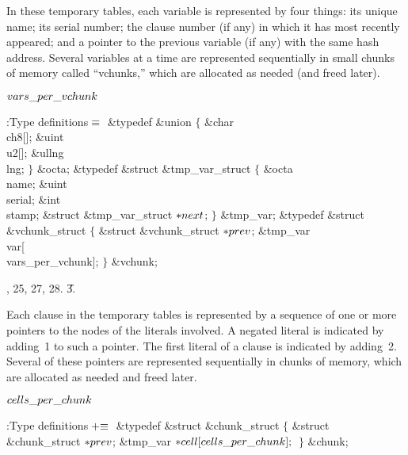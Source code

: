 In these temporary tables, each variable is represented by four things:
its unique name; its serial number; the clause number (if any) in which it has
most recently appeared; and a pointer to the previous variable (if any)
with the same hash address. Several variables at a time
are represented sequentially in small chunks of memory called ``vchunks,''
which are allocated as needed (and freed later).

\Y\B\4\D$\\{vars\_per\_vchunk}$ \5
\par
\Y\B\4:Type definitions\X${}\equiv{}$\6
\&{typedef} \&{union} ${}\{{}$\1\6
\&{char} \\{ch8}[];\6
\&{uint} \\{u2}[];\6
\&{ullng} \\{lng};\2\6
${}\}{}$ \&{octa};\6
\&{typedef} \&{struct} \&{tmp\_var\_struct} ${}\{{}$\1\6
\&{octa} \\{name};\6
\&{uint} \\{serial};\6
\&{int} \\{stamp};\6
\&{struct} \&{tmp\_var\_struct} ${}{*}\\{next}{}$;\2%
\6
${}\}{}$ \&{tmp\_var};\7
\&{typedef} \&{struct} \&{vchunk\_struct} ${}\{{}$\1\6
\&{struct} \&{vchunk\_struct} ${}{*}\\{prev}{}$;\6
\&{tmp\_var} \\{var}[\\{vars\_per\_vchunk}];\2\6
${}\}{}$ \&{vchunk};\par
{}, 25, 27, 28.
\U3.\fi

Each clause in the temporary tables is represented by a sequence of
one or more pointers to the  nodes of the literals involved.
A negated literal is indicated by adding~1 to such a pointer.
The first literal of a clause is indicated by adding~2.
Several of these pointers are represented sequentially in chunks
of memory, which are allocated as needed and freed later.

\Y\B\4\D$\\{cells\_per\_chunk}$ \5
\par
\Y\B\4:Type definitions\X${}\mathrel+\equiv{}$\6
\&{typedef} \&{struct} \&{chunk\_struct} ${}\{{}$\1\6
\&{struct} \&{chunk\_struct} ${}{*}\\{prev}{}$;\6
\&{tmp\_var} ${}{*}\\{cell}[\\{cells\_per\_chunk}];{}$\2\6
${}\}{}$ \&{chunk};\par
\fi

